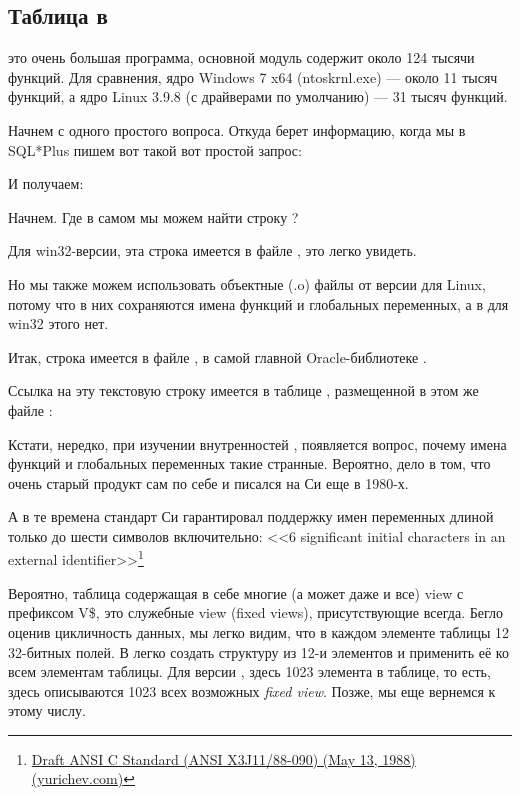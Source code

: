 \subsection{Таблица  в \oracle}

\myindex{\oracle}
 это очень большая программа, основной модуль  содержит около 124 тысячи функций. Для сравнения, ядро Windows 7 x64 (ntoskrnl.exe) --- около 11 тысяч функций, а ядро Linux 3.9.8 (с драйверами по умолчанию) --- 31 тысяч функций.

Начнем с одного простого вопроса. Откуда \oracle берет информацию, когда мы в SQL*Plus пишем вот такой вот простой запрос:



И получаем:



Начнем. Где в самом \oracle мы можем найти строку ?

Для win32-версии, эта строка имеется в файле , это легко увидеть.

Но мы также можем использовать объектные (.o) файлы от версии \oracle для Linux, потому что в них сохраняются имена функций и глобальных переменных, а в  для win32 этого нет.

Итак, строка  имеется в файле , в самой главной Oracle-библиотеке .

Ссылка на эту текстовую строку имеется в таблице , размещенной в этом же файле :



Кстати, нередко, при изучении внутренностей \oracle, появляется вопрос, почему имена функций и глобальных переменных такие странные.
Вероятно, дело в том, что \oracle очень старый продукт сам по себе и писался на Си еще в 1980-х.

А в те времена стандарт Си гарантировал поддержку имен переменных длиной только до шести символов включительно:
<<6 significant initial characters in an external identifier>>\footnote{\href{https://yurichev.com/ref/Draft%20ANSI%20C%20Standard%20(ANSI%20X3J11-88-090)%20(May%2013,%201988).txt}{Draft ANSI C Standard (ANSI X3J11/88-090) (May 13, 1988) (yurichev.com)}}

Вероятно, таблица  содержащая в себе многие (а может даже и все) view с префиксом V\$, это служебные view (fixed views), присутствующие всегда.
Бегло оценив цикличность данных, мы легко видим, что в каждом элементе таблицы  12 32-битных полей.
В \IDA легко создать структуру из 12-и элементов и применить её ко всем элементам таблицы.
Для версии , здесь 1023 элемента в таблице, то есть, здесь описываются 1023 всех возможных \emph{fixed view}.
Позже, мы еще вернемся к этому числу.


